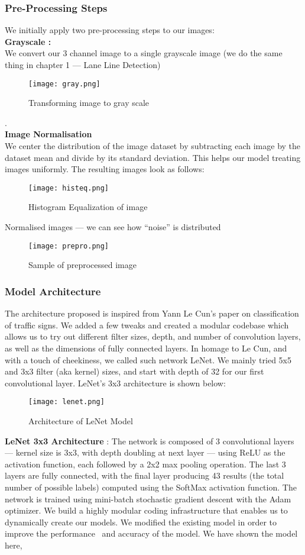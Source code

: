 \subsubsection{Pre-Processing Steps}
We initially apply two pre-processing steps to our images:\\
{\textbf{Grayscale :}}\\
We convert our 3 channel image to a single grayscale image (we do the same thing in chapter 1 — Lane Line Detection)
\begin{figure}[H]
	\centering
	\texttt{[image: gray.png]}
	\caption{Transforming image to gray scale}
\end{figure}
.\\
{\textbf{Image Normalisation}}\\
We center the distribution of the image dataset by subtracting each image by the dataset mean and divide by its standard deviation. This helps our model treating images uniformly. The resulting images look as follows:
\begin{figure}[H]
	\centering
	\texttt{[image: histeq.png]}
	\caption{Histogram Equalization of image}
\end{figure}
Normalised images — we can see how “noise” is distributed

\begin{figure}[H]
	\centering
	\texttt{[image: prepro.png]}
	\caption{Sample of preprocessed image}
\end{figure}

\subsubsection{Model Architecture}
The architecture proposed is inspired from Yann Le Cun’s paper on classification of traffic signs. We added a few tweaks and created a modular codebase which allows us to try out different filter sizes, depth, and number of convolution layers, as well as the dimensions of fully connected layers. In homage to Le Cun, and with a touch of cheekiness, we called such network LeNet.
We mainly tried 5x5 and 3x3 filter (aka kernel) sizes, and start with depth of 32 for our first convolutional layer. LeNet’s 3x3 architecture is shown below:
\begin{figure}[H]
	\centering
	\texttt{[image: lenet.png]}
	\caption{Architecture of LeNet Model}
\end{figure}

{\textbf{LeNet 3x3 Architecture}} : The network is composed of 3 convolutional layers — kernel size is 3x3, with depth doubling at next layer — using ReLU as the activation function, each followed by a 2x2 max pooling operation. The last 3 layers are fully connected, with the final layer producing 43 results (the total number of possible labels) computed using the SoftMax activation function. The network is trained using mini-batch stochastic gradient descent with the Adam optimizer. We build a highly modular coding infrastructure that enables us to dynamically create our models. We modified the existing model in order to improve the performance~\cite{hedlund2017autonomous} and accuracy of the model. We have shown the model here,

